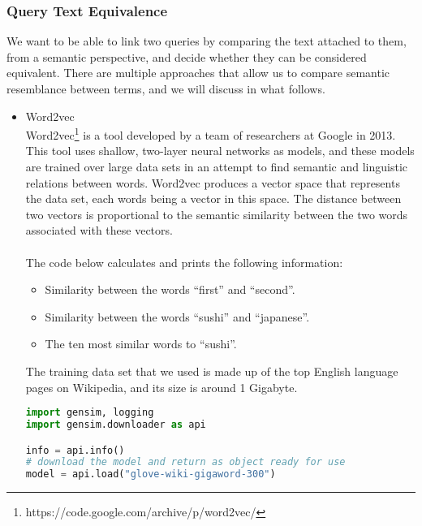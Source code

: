 \subsubsection{Query Text Equivalence}
We want to be able to link two queries by comparing the text attached to them, from a semantic perspective, and decide whether they can be considered equivalent. There are multiple approaches that allow us to compare semantic resemblance between terms, and we will discuss in what follows.
\begin{itemize}
\item Word2vec\\
Word2vec\footnote{https://code.google.com/archive/p/word2vec/} is a tool developed by a team of researchers at Google in 2013. This tool uses shallow, two-layer neural networks as models, and these models are trained over large data sets in an attempt to find semantic and linguistic relations between words. Word2vec produces a vector space that represents the data set, each words being a vector in this space. The distance between two vectors is proportional to the semantic similarity between the two words associated with these vectors.\\\\
The code below calculates and prints the following information:
\begin{itemize}
\item Similarity between the words ``first'' and ``second''.
\item Similarity between the words ``sushi'' and ``japanese''.
\item The ten most similar words to ``sushi''.
\end{itemize}
The training data set that we used is made up of the top English language pages on Wikipedia, and its size is around 1 Gigabyte.\\
\begin{lstlisting}[language=Python]
import gensim, logging
import gensim.downloader as api

info = api.info()
# download the model and return as object ready for use
model = api.load("glove-wiki-gigaword-300")  


\end{lstlisting}
\end{itemize}

